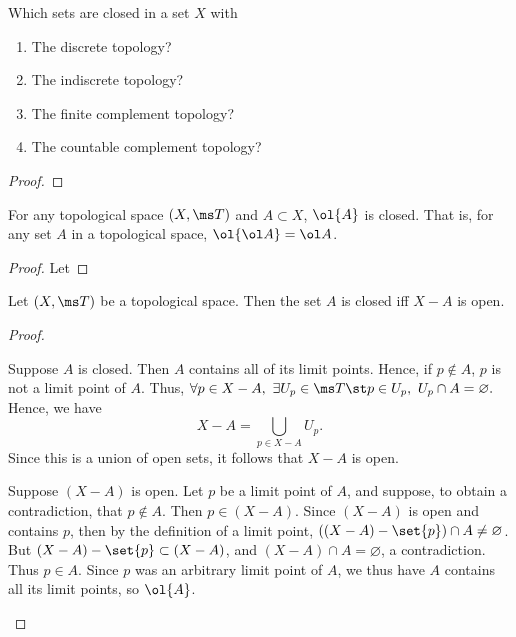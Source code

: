 \begin{problem}[3.12]
  Which sets are closed in a set $X$ with
  \begin{enumerate}
    \item The discrete topology?
    \item The indiscrete topology?
    \item The finite complement topology?
    \item The countable complement topology?
  \end{enumerate}
\end{problem}
\begin{proof}

\end{proof}
\begin{problem}[3.13]
  For any topological space $(X, \ms T)$ and $A \subset X$, $\ol{A}$ is closed.
  That is, for any set $A$ in a topological space, $\ol{\ol A} = \ol A$.
\end{problem}
\begin{proof}
  Let
\end{proof}

\begin{problem}[3.14]
  Let $(X, \ms T)$ be a topological space. Then the set $A$ is closed iff $X -
  A$ is open.
\end{problem}
\begin{proof}~
  \begin{iffproof}
    \item Suppose $A$ is closed. Then $A$ contains all of its limit points.
      Hence, if $p \not \in A$, $p$ is not a limit point of $A$. Thus, $\forall
      p \in X - A,\ \exists U_p \in \ms T \st p \in U_p,\ U_p \cap A =
      \varnothing.$ Hence, we have
      \[
        X - A = \bigcup_{p \in X - A} U_p.
      \]
      Since this is a union of open sets, it follows that $X-A$ is open.
    \item Suppose $(X -A)$ is open. Let $p$ be a limit point of $A$, and
      suppose, to obtain a contradiction, that $p \not \in A$. Then $p \in
      (X-A)$. Since $(X-A)$ is open and contains $p$, then by the definition of
      a limit point, $((X-A) - \set{p}) \cap A \neq \varnothing$. But $(X - A) -
      \set{p} \subset (X-A)$, and $(X-A) \cap A = \varnothing$, a contradiction.
      Thus $p \in A$. Since $p$ was an arbitrary limit point of $A$, we thus
      have $A$ contains all its limit points, so $\ol{A}$.
  \end{iffproof}
\end{proof}

